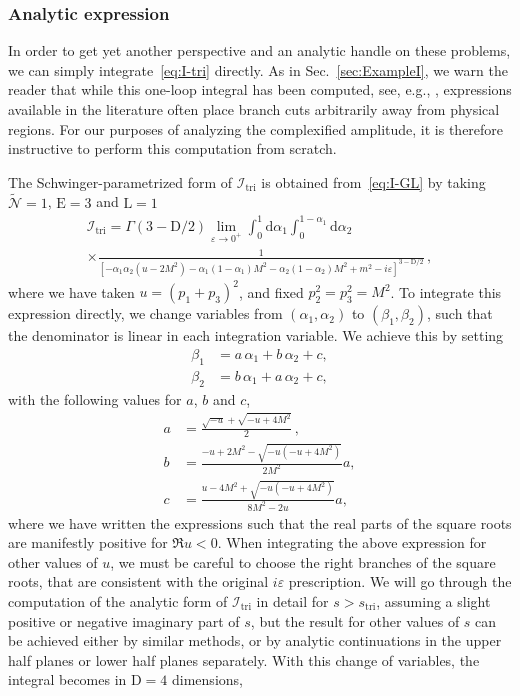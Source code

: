 \documentclass[12pt]{article}
\numberwithin{figure}{section}
\def \D {\mathrm{D}}
\def \E {\mathrm{E}}
\def \L {\mathrm{L}}
\def \d {\mathrm{d}}
\def \eps {\varepsilon}
\def \I {\mathcal{I}}
\def \triangle {\mathrm{tri}}
\newcommand{\mc}[1]{\mathcal{#1}}
\begin{document}
    \subsubsection{Analytic expression}
    
    In order to get yet another perspective and an analytic handle on these problems, we can simply integrate~\eqref{eq:I-tri} directly. As in Sec.~\ref{sec:ExampleI}, we warn the reader that while this one-loop integral has been computed, see, e.g., \cite{tHooft:1978jhc,Patel:2015tea}, expressions available in the literature often place branch cuts arbitrarily away from physical regions. For our purposes of analyzing the complexified amplitude, it is therefore instructive to perform this computation from scratch.

    The Schwinger-parametrized form of $\mc{I}_\triangle$ is obtained from~\eqref{eq:I-GL} by taking $\tilde{\mathcal{N}}=1$, $\E=3$ and $\L=1$
    \begin{multline}
        \I_\triangle = \Gamma\left(3-\D/2\right) \lim_{\eps \to 0^+} \int_0^1 \d \alpha_1 \int_0^{1-\alpha_1} \d\alpha_2 \\ 
        \times \frac{1}{\left[ - \alpha_1 \alpha_2 (u-2 M^2) -\alpha_1 (1-\alpha_1) M^2 - \alpha_2 \left(1-\alpha_2\right) M^2 + m^2-i \varepsilon \right]^{3-\D/2}} \,,
        \label{eq:triintegral}
    \end{multline}
    where we have taken $u=(p_1+p_3)^2$, and fixed $p_2^2=p_3^2=M^2$. 
    To integrate this expression directly, we change variables from $(\alpha_1,\alpha_2)$ to $(\beta_1,\beta_2)$, such that the denominator is linear in each integration variable.
    We achieve this by setting
    \begin{align}
        \beta_1 & = a \, \alpha_1 + b \, \alpha_2 + c, \\
        \beta_2 & = b \, \alpha_1 + a \, \alpha_2 + c,
    \end{align}
    with the following values for $a$, $b$ and $c$,
    \begin{align}
        a & = \frac{\sqrt{-u}+\sqrt{-u+4 M^2}}{2} \,, \\
        b & = \frac{- u + 2 M^2 - \sqrt{-u \left(-u+4M^2\right)}}{2 M^2} a, \\
        c & = \frac{u - 4 M^2 + \sqrt{-u \left(-u+4M^2\right)}}{8 M^2-2 u} a,
    \end{align}
    where we have written the expressions such that the real parts of the square roots are manifestly positive for $\Re u <0$. When integrating the above expression for other values of $u$, we must be careful to choose the right branches of the square roots, that are consistent with the original $i \eps$ prescription. We will go through the computation of the analytic form of $\I_\triangle$ in detail for $s>s_\triangle$, assuming a slight positive or negative imaginary part of $s$, but the result for other values of $s$ can be achieved either by similar methods, or by analytic continuations in the upper half planes or lower half planes separately. With this change of variables, the integral becomes in $\D=4$ dimensions,
\end{document}
